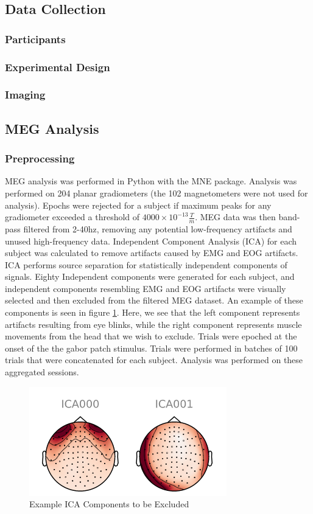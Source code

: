 \documentclass[../main.tex]{subfiles}
\begin{document}
\subsection{Data Collection}
\subsubsection{Participants}

\subsubsection{Experimental Design}

\subsubsection{Imaging}


\subsection{MEG Analysis}
\subsubsection{Preprocessing}
MEG analysis was performed in Python with the MNE package. Analysis was performed on 204 planar gradiometers (the 102 magnetometers were not used for analysis). Epochs were rejected for a subject if maximum peaks for any gradiometer exceeded a threshold of $4000\times10^{-13}  \frac{T}{m}$. MEG data was then band-pass filtered from 2-40hz, removing any potential low-frequency artifacts and unused high-frequency data. Independent Component Analysis (ICA) for each subject was calculated to remove artifacts caused by EMG and EOG artifacts. ICA performs source separation for statistically independent components of signals. Eighty Independent components were generated for each subject, and independent components resembling EMG and EOG artifacts were visually selected and then excluded from the filtered MEG dataset. An example of these components is seen in figure \ref{ica_exclude}. Here, we see that the left component represents artifacts resulting from eye blinks, while the right component represents muscle movements from the head that we wish to exclude. Trials were epoched at the onset of the the gabor patch stimulus. Trials were performed in batches of 100 trials that were concatenated for each subject. Analysis was performed on these aggregated sessions.

\begin{figure}
    \centering
    \includegraphics{figures/methods/ica_figure.PNG}
    \caption{Example ICA Components to be Excluded}
    \label{ica_exclude}
\end{figure}
\end{document}

